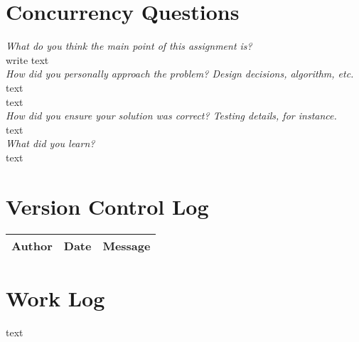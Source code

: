 \documentclass[letterpaper,10pt,titlepage]{article}
\begin{document}
\section{Concurrency Questions}

\textit{What do you think the main point of this assignment is?}\\

write text\\

\textit{How did you personally approach the problem? Design decisions, algorithm, etc.}\\

text\\

text\\

\textit{How did you ensure your solution was correct? Testing details, for instance.}\\

text\\

\textit{What did you learn?}\\

text\\

\section{Version Control Log}

\begin{tabular}{lll} \textbf{Author}
     & \textbf{Date}
     & \textbf{Message}

\\ \hline
\end{tabular}

\section{Work Log}

text
\end{document}
